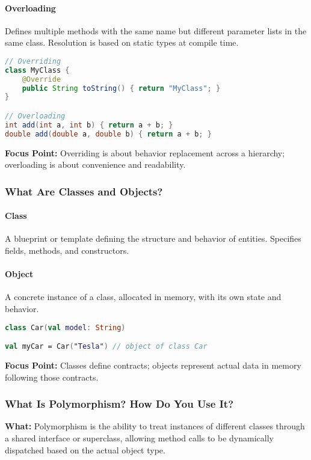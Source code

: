 \documentclass[a4paper,12pt]{article}
\begin{document}
\paragraph{Overloading}
Defines multiple methods with the same name but different parameter lists in the same class. Resolution is based on static types at compile time.

\begin{lstlisting}[language=Java]
// Overriding
class MyClass {
    @Override
    public String toString() { return "MyClass"; }
}

// Overloading
int add(int a, int b) { return a + b; }
double add(double a, double b) { return a + b; }
\end{lstlisting}

\textbf{Focus Point:} Overriding is about behavior replacement across a hierarchy; overloading is about convenience and readability.

\subsubsection{What Are Classes and Objects?}

\paragraph{Class}
A blueprint or template defining the structure and behavior of entities. Specifies fields, methods, and constructors.

\paragraph{Object}
A concrete instance of a class, allocated in memory, with its own state and behavior.

\begin{lstlisting}[language=Kotlin]
class Car(val model: String)

val myCar = Car("Tesla") // object of class Car
\end{lstlisting}

\textbf{Focus Point:} Classes define contracts; objects represent actual data in memory following those contracts.


\subsubsection{What Is Polymorphism? How Do You Use It?}

\textbf{What:} Polymorphism is the ability to treat instances of different classes through a shared interface or superclass, allowing method calls to be dynamically dispatched based on the actual object type.
\end{document}

